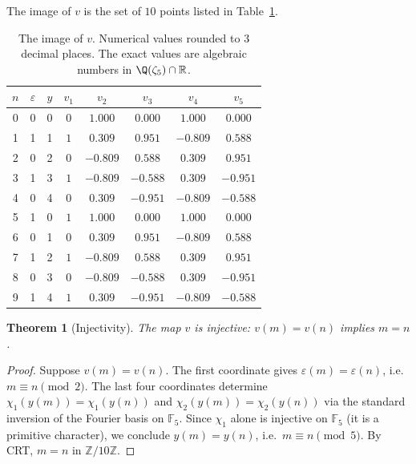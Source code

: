\documentclass[11pt,reqno]{amsart}
\newtheorem{theorem}{Theorem}[section]
\theoremstyle{definition}
\newcommand{\Z}{\mathbb{Z}}
\newcommand{\R}{\mathbb{R}}
\newcommand{\F}{\mathbb{F}}
\begin{document}
The image of $v$ is the set of $10$ points listed in
Table~\ref{tab:embedding}.

\begin{table}[h]
\caption{The image of $v$. Numerical values rounded to $3$ decimal
places. The exact values are algebraic numbers in $\Q(\zeta_5) \cap
\R$.}
\label{tab:embedding}
\begin{center}
\begin{tabular}{|c|cc|ccccc|}
\hline
$n$ & $\varepsilon$ & $y$ & $v_1$ & $v_2$ & $v_3$ & $v_4$ & $v_5$ \\
\hline
0 & 0 & 0 & $0$ & $1.000$ & $0.000$ & $1.000$ & $0.000$ \\
1 & 1 & 1 & $1$ & $0.309$ & $0.951$ & $-0.809$ & $0.588$ \\
2 & 0 & 2 & $0$ & $-0.809$ & $0.588$ & $0.309$ & $0.951$ \\
3 & 1 & 3 & $1$ & $-0.809$ & $-0.588$ & $0.309$ & $-0.951$ \\
4 & 0 & 4 & $0$ & $0.309$ & $-0.951$ & $-0.809$ & $-0.588$ \\
5 & 1 & 0 & $1$ & $1.000$ & $0.000$ & $1.000$ & $0.000$ \\
6 & 0 & 1 & $0$ & $0.309$ & $0.951$ & $-0.809$ & $0.588$ \\
7 & 1 & 2 & $1$ & $-0.809$ & $0.588$ & $0.309$ & $0.951$ \\
8 & 0 & 3 & $0$ & $-0.809$ & $-0.588$ & $0.309$ & $-0.951$ \\
9 & 1 & 4 & $1$ & $0.309$ & $-0.951$ & $-0.809$ & $-0.588$ \\
\hline
\end{tabular}
\end{center}
\end{table}

\begin{theorem}[Injectivity]
\label{thm:injective}
The map $v$ is injective: $v(m) = v(n)$ implies $m = n$.
\end{theorem}

\begin{proof}
Suppose $v(m) = v(n)$. The first coordinate gives
$\varepsilon(m) = \varepsilon(n)$, i.e.\ $m \equiv n \pmod 2$. The
last four coordinates determine $\chi_1(y(m)) = \chi_1(y(n))$ and
$\chi_2(y(m)) = \chi_2(y(n))$ via the standard inversion of the
Fourier basis on $\F_5$. Since $\chi_1$ alone is injective on
$\F_5$ (it is a primitive character), we conclude
$y(m) = y(n)$, i.e.\ $m \equiv n \pmod 5$.
By CRT, $m = n$ in $\Z/10\Z$.
\end{proof}
\end{document}
